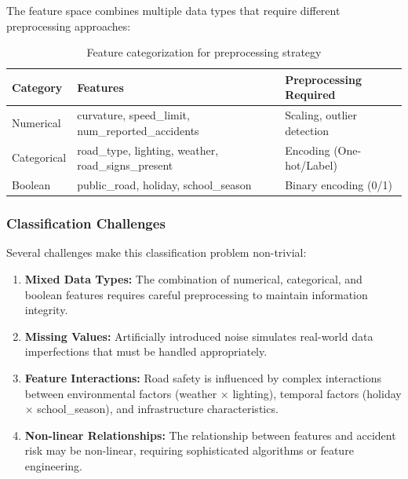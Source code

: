 \documentclass[12pt,a4paper]{article}
\begin{document}
The feature space combines multiple data types that require different preprocessing approaches:

\begin{table}[H]
    \centering
    \sffamily
    \caption{Feature categorization for preprocessing strategy}
    \label{tab:feature_types}
    \begin{tabularx}{\textwidth}{l l X}
        \toprule
        \textbf{Category} & \textbf{Features} & \textbf{Preprocessing Required} \\
        \midrule
        Numerical & curvature, speed\_limit, num\_reported\_accidents & Scaling, outlier detection \\
        \midrule
        Categorical & road\_type, lighting, weather, road\_signs\_present & Encoding (One-hot/Label) \\
        \midrule
        Boolean & public\_road, holiday, school\_season & Binary encoding (0/1) \\
        \bottomrule
    \end{tabularx}
\end{table}

\subsubsection{Classification Challenges}

Several challenges make this classification problem non-trivial:

\begin{enumerate}
    \item \textbf{Mixed Data Types:} The combination of numerical, categorical, and boolean features requires careful preprocessing to maintain information integrity.
    
    \item \textbf{Missing Values:} Artificially introduced noise simulates real-world data imperfections that must be handled appropriately.
    
    \item \textbf{Feature Interactions:} Road safety is influenced by complex interactions between environmental factors (weather × lighting), temporal factors (holiday × school\_season), and infrastructure characteristics.
    
    \item \textbf{Non-linear Relationships:} The relationship between features and accident risk may be non-linear, requiring sophisticated algorithms or feature engineering.
\end{enumerate}
\end{document}
